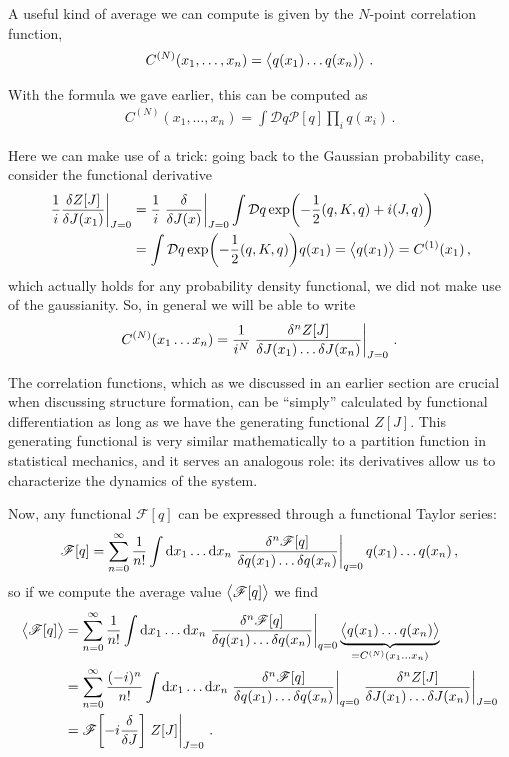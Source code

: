 \documentclass[main.tex]{subfiles}
\begin{document}
A useful kind of average we can compute is given by the \(N\)-point correlation function, 
%
\begin{align}
C^{(N)}(x_1, \dots, x_n) = \expval{q(x_1) \dots q(x_n)}
\,.
\end{align}

With the formula we gave earlier, this can be computed as 
%
\begin{align}
C^{(N)}(x_1, \dots , x_n)
= \int \mathcal{D}q \mathcal{P}[q] \prod_i q(x_i)
\,.
\end{align}

Here we can make use of a trick: going back to the Gaussian probability case, consider the functional derivative
%
\begin{align}
\eval{\frac{1}{i}\fdv{Z[J]}{J(x_1 )}}_{J = 0} &= \frac{1}{i} \eval{\fdv{}{J(x)}}_{J=0} \int \mathcal{D}q
\exp(- \frac{1}{2} (q, K, q) + i (J,q))  \\
&= \int \mathcal{D}q \exp(- \frac{1}{2} (q, K, q)) q(x_1 )
= \expval{q(x_1 )} = C^{(1)}(x_1 )
\,,
\end{align}
%
which actually holds for any probability density functional, we did not make use of the gaussianity.
So, in general we will be able to write 
%
\begin{align}
C^{(N)} (x_1 \dots x_n) = \frac{1}{i^{N}} \eval{\frac{ \delta^{n} Z[J]}{ \delta J(x_1 )\dots \delta J(x_n)}}_{J =0 }
\,.
\end{align}

The correlation functions, which as we discussed in an earlier section are crucial when discussing structure formation, can be ``simply'' calculated by functional differentiation as long as we have the generating functional \(Z[J]\).
This generating functional is very similar mathematically to a partition function in statistical mechanics, and it serves an analogous role: its derivatives allow us to characterize the dynamics of the system. 

Now, any functional \(\mathscr{F} [q]\) can be expressed through a functional Taylor series:
%
\begin{align}
\mathscr{F}[q] = \sum _{n=0}^{\infty } \frac{1}{n!}
\int \dd{x_1} \dots \dd{x_n} \eval{\frac{ \delta^{n} \mathscr{F}[q]}{ \delta q(x_1) \dots \delta q(x_n)}}_{q = 0} q(x_1) \dots q(x_n)
\,,
\end{align}
%
so if we compute the average value \(\expval{\mathscr{F}[q]}\) we find 
%
\begin{align}
\expval{\mathscr{F}[q]} &= 
\sum _{n=0}^{\infty } \frac{1}{n!}
\int \dd{x_1} \dots \dd{x_n} \eval{\frac{ \delta^{n} \mathscr{F}[q]}{ \delta q(x_1) \dots \delta q(x_n)}}_{q = 0} \underbrace{\expval{q(x_1) \dots q(x_n)}}_{= C^{(N)} (x_1 \dots x_n)}  \\
&=\sum _{n=0}^{\infty } \frac{(-i)^{n}}{n!}
\int \dd{x_1} \dots \dd{x_n} \eval{\frac{ \delta^{n} \mathscr{F}[q]}{ \delta q(x_1) \dots \delta q(x_n)}}_{q = 0} 
\eval{\frac{ \delta^{n} Z[J]}{ \delta J(x_1 )\dots \delta J(x_n)}}_{J =0 } \\
&= \mathscr{F}\qty[ -i \fdv{}{J}]\eval{ Z[J]}_{J=0}
\,.
\end{align}
\end{document}
